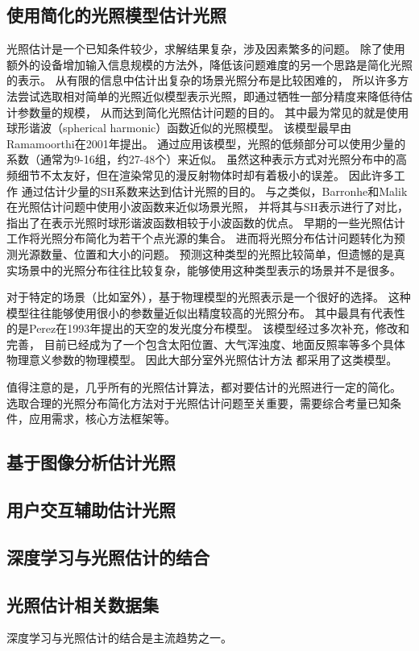 \subsection{使用简化的光照模型估计光照}
光照估计是一个已知条件较少，求解结果复杂，涉及因素繁多的问题。
除了使用额外的设备增加输入信息规模的方法外，降低该问题难度的另一个思路是简化光照的表示。
从有限的信息中估计出复杂的场景光照分布是比较困难的，
所以许多方法尝试选取相对简单的光照近似模型表示光照，即通过牺牲一部分精度来降低待估计参数量的规模，
从而达到简化光照估计问题的目的。
其中最为常见的就是使用球形谐波（spherical harmonic）函数近似的光照模型。
该模型最早由Ramamoorthi\cite{ramamoorthi2001efficient}在2001年提出。
通过应用该模型，光照的低频部分可以使用少量的系数（通常为9-16组，约27-48个）来近似。
虽然这种表示方式对光照分布中的高频细节不太友好，但在渲染常见的漫反射物体时却有着极小的误差。
因此许多工作\cite{ramamoorthi2001signal,kemelmacher20113d,garrido2013reconstructing,
knorr2014real,li2014intrinsic,barron2015shape, rematas2016deep}
通过估计少量的SH系数来达到估计光照的目的。
与之类似，Barronhe和Malik\cite{okabe2004spherical}在光照估计问题中使用小波函数来近似场景光照，
并将其与SH表示进行了对比，指出了在表示光照时球形谐波函数相较于小波函数的优点。
早期的一些光照估计工作\cite{sato1999acquiring,  panagopoulos2011illumination, 
wang2002estimation, li2003multiple, sato2003illumination}将光照分布简化为若干个点光源的集合。
进而将光照分布估计问题转化为预测光源数量、位置和大小的问题。
预测这种类型的光照比较简单，但遗憾的是真实场景中的光照分布往往比较复杂，能够使用这种类型表示的场景并不是很多。

对于特定的场景（比如室外），基于物理模型的光照表示是一个很好的选择。
这种模型往往能够使用很小的参数量近似出精度较高的光照分布。
其中最具有代表性的是Perez\cite{perez1993all}在1993年提出的天空的发光度分布模型。
该模型经过多次补充，修改和完善\cite{nishita1996display, sirai1993display,
preetham1999practical,raab2008unbiased,hosek2012analytic, hovsekhovsek2013adding}，
目前已经成为了一个包含太阳位置、大气浑浊度、地面反照率等多个具体物理意义参数的物理模型。
因此大部分室外光照估计方法\cite{lalonde2008does, lalonde2010sun, lalonde2012estimating, sunkavalli2008color}
都采用了这类模型。

值得注意的是，几乎所有的光照估计算法，都对要估计的光照进行一定的简化。
选取合理的光照分布简化方法对于光照估计问题至关重要，需要综合考量已知条件，应用需求，核心方法框架等。

\subsection{基于图像分析估计光照}
\cite{karsch2014automatic}
\cite{lombardi2016reflectance}
\subsection{用户交互辅助估计光照}
\subsection{深度学习与光照估计的结合}

\subsection{光照估计相关数据集}

深度学习与光照估计的结合是主流趋势之一。